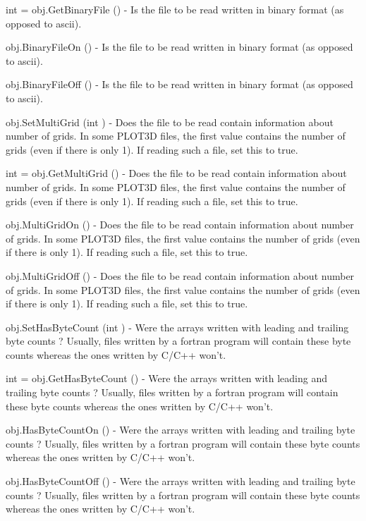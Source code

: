 \begin{DoxyItemize}
\item {\ttfamily int = obj.\-Get\-Binary\-File ()} -\/ Is the file to be read written in binary format (as opposed to ascii).  
\item {\ttfamily obj.\-Binary\-File\-On ()} -\/ Is the file to be read written in binary format (as opposed to ascii).  
\item {\ttfamily obj.\-Binary\-File\-Off ()} -\/ Is the file to be read written in binary format (as opposed to ascii).  
\item {\ttfamily obj.\-Set\-Multi\-Grid (int )} -\/ Does the file to be read contain information about number of grids. In some P\-L\-O\-T3\-D files, the first value contains the number of grids (even if there is only 1). If reading such a file, set this to true.  
\item {\ttfamily int = obj.\-Get\-Multi\-Grid ()} -\/ Does the file to be read contain information about number of grids. In some P\-L\-O\-T3\-D files, the first value contains the number of grids (even if there is only 1). If reading such a file, set this to true.  
\item {\ttfamily obj.\-Multi\-Grid\-On ()} -\/ Does the file to be read contain information about number of grids. In some P\-L\-O\-T3\-D files, the first value contains the number of grids (even if there is only 1). If reading such a file, set this to true.  
\item {\ttfamily obj.\-Multi\-Grid\-Off ()} -\/ Does the file to be read contain information about number of grids. In some P\-L\-O\-T3\-D files, the first value contains the number of grids (even if there is only 1). If reading such a file, set this to true.  
\item {\ttfamily obj.\-Set\-Has\-Byte\-Count (int )} -\/ Were the arrays written with leading and trailing byte counts ? Usually, files written by a fortran program will contain these byte counts whereas the ones written by C/\-C++ won't.  
\item {\ttfamily int = obj.\-Get\-Has\-Byte\-Count ()} -\/ Were the arrays written with leading and trailing byte counts ? Usually, files written by a fortran program will contain these byte counts whereas the ones written by C/\-C++ won't.  
\item {\ttfamily obj.\-Has\-Byte\-Count\-On ()} -\/ Were the arrays written with leading and trailing byte counts ? Usually, files written by a fortran program will contain these byte counts whereas the ones written by C/\-C++ won't.  
\item {\ttfamily obj.\-Has\-Byte\-Count\-Off ()} -\/ Were the arrays written with leading and trailing byte counts ? Usually, files written by a fortran program will contain these byte counts whereas the ones written by C/\-C++ won't.  

\end{DoxyItemize}
